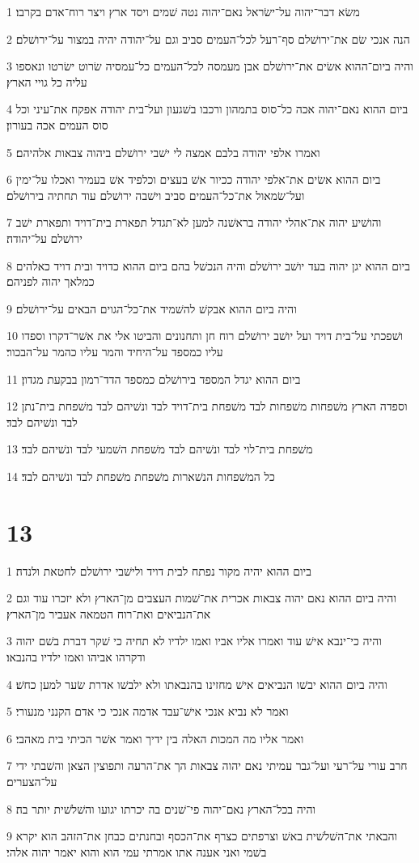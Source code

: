 \par 1 משׂא דבר־יהוה על־ישׂראל נאם־יהוה נטה שׁמים ויסד ארץ ויצר רוח־אדם בקרבו׃
\par 2 הנה אנכי שׂם את־ירושׁלם סף־רעל לכל־העמים סביב וגם על־יהודה יהיה במצור על־ירושׁלם׃
\par 3 והיה ביום־ההוא אשׂים את־ירושׁלם אבן מעמסה לכל־העמים כל־עמסיה שׂרוט ישׂרטו ונאספו עליה כל גויי הארץ׃
\par 4 ביום ההוא נאם־יהוה אכה כל־סוס בתמהון ורכבו בשׁגעון ועל־בית יהודה אפקח את־עיני וכל סוס העמים אכה בעורון׃
\par 5 ואמרו אלפי יהודה בלבם אמצה לי ישׁבי ירושׁלם ביהוה צבאות אלהיהם׃
\par 6 ביום ההוא אשׂים את־אלפי יהודה ככיור אשׁ בעצים וכלפיד אשׁ בעמיר ואכלו על־ימין ועל־שׂמאול את־כל־העמים סביב וישׁבה ירושׁלם עוד תחתיה בירושׁלם׃
\par 7 והושׁיע יהוה את־אהלי יהודה בראשׁנה למען לא־תגדל תפארת בית־דויד ותפארת ישׁב ירושׁלם על־יהודה׃
\par 8 ביום ההוא יגן יהוה בעד יושׁב ירושׁלם והיה הנכשׁל בהם ביום ההוא כדויד ובית דויד כאלהים כמלאך יהוה לפניהם׃
\par 9 והיה ביום ההוא אבקשׁ להשׁמיד את־כל־הגוים הבאים על־ירושׁלם׃
\par 10 ושׁפכתי על־בית דויד ועל יושׁב ירושׁלם רוח חן ותחנונים והביטו אלי את אשׁר־דקרו וספדו עליו כמספד על־היחיד והמר עליו כהמר על־הבכור׃
\par 11 ביום ההוא יגדל המספד בירושׁלם כמספד הדד־רמון בבקעת מגדון׃
\par 12 וספדה הארץ משׁפחות משׁפחות לבד משׁפחת בית־דויד לבד ונשׁיהם לבד משׁפחת בית־נתן לבד ונשׁיהם לבד׃
\par 13 משׁפחת בית־לוי לבד ונשׁיהם לבד משׁפחת השׁמעי לבד ונשׁיהם לבד׃
\par 14 כל המשׁפחות הנשׁארות משׁפחת משׁפחת לבד ונשׁיהם לבד׃

\chapter{13}

\par 1 ביום ההוא יהיה מקור נפתח לבית דויד ולישׁבי ירושׁלם לחטאת ולנדה׃
\par 2 והיה ביום ההוא נאם יהוה צבאות אכרית את־שׁמות העצבים מן־הארץ ולא יזכרו עוד וגם את־הנביאים ואת־רוח הטמאה אעביר מן־הארץ׃
\par 3 והיה כי־ינבא אישׁ עוד ואמרו אליו אביו ואמו ילדיו לא תחיה כי שׁקר דברת בשׁם יהוה ודקרהו אביהו ואמו ילדיו בהנבאו׃
\par 4 והיה ביום ההוא יבשׁו הנביאים אישׁ מחזינו בהנבאתו ולא ילבשׁו אדרת שׂער למען כחשׁ׃
\par 5 ואמר לא נביא אנכי אישׁ־עבד אדמה אנכי כי אדם הקנני מנעורי׃
\par 6 ואמר אליו מה המכות האלה בין ידיך ואמר אשׁר הכיתי בית מאהבי׃
\par 7 חרב עורי על־רעי ועל־גבר עמיתי נאם יהוה צבאות הך את־הרעה ותפוצין הצאן והשׁבתי ידי על־הצערים׃
\par 8 והיה בכל־הארץ נאם־יהוה פי־שׁנים בה יכרתו יגועו והשׁלשׁית יותר בה׃
\par 9 והבאתי את־השׁלשׁית באשׁ וצרפתים כצרף את־הכסף ובחנתים כבחן את־הזהב הוא יקרא בשׁמי ואני אענה אתו אמרתי עמי הוא והוא יאמר יהוה אלהי׃

